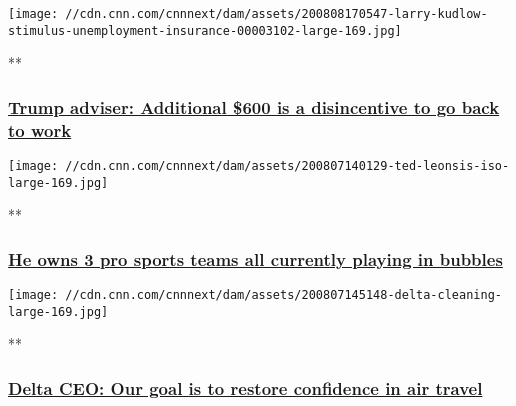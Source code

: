 \href{/videos/business/2020/08/07/larry-kudlow-stimulus-unemployment-insurance.cnnbusiness/video/playlists/business-news/}{}

\texttt{[image: //cdn.cnn.com/cnnnext/dam/assets/200808170547-larry-kudlow-stimulus-unemployment-insurance-00003102-large-169.jpg]}

**

\hypertarget{trump-adviser-additional-600-is-a-disincentive-to-go-back-to-work}{%
\subsubsection{\texorpdfstring{\href{/videos/business/2020/08/07/larry-kudlow-stimulus-unemployment-insurance.cnnbusiness/video/playlists/business-news/}{Trump
adviser: Additional \$600 is a disincentive to go back to
work}}{Trump adviser: Additional \$600 is a disincentive to go back to work}}\label{trump-adviser-additional-600-is-a-disincentive-to-go-back-to-work}}

\href{/videos/business/2020/08/07/ted-leonsis-washington-nationals-mystics-wizards-sports-bubble-interview.cnn/video/playlists/business-news/}{}

\texttt{[image: //cdn.cnn.com/cnnnext/dam/assets/200807140129-ted-leonsis-iso-large-169.jpg]}

**

\hypertarget{he-owns-3-pro-sports-teams-all-currently-playing-in-bubbles}{%
\subsubsection{\texorpdfstring{\href{/videos/business/2020/08/07/ted-leonsis-washington-nationals-mystics-wizards-sports-bubble-interview.cnn/video/playlists/business-news/}{He
owns 3 pro sports teams all currently playing in
bubbles}}{He owns 3 pro sports teams all currently playing in bubbles}}\label{he-owns-3-pro-sports-teams-all-currently-playing-in-bubbles}}

\href{/videos/business/2020/08/07/delta-ceo-ed-bastian-safety-flying-covid-19-coronavirus.cnnbusiness/video/playlists/business-news/}{}

\texttt{[image: //cdn.cnn.com/cnnnext/dam/assets/200807145148-delta-cleaning-large-169.jpg]}

**

\hypertarget{delta-ceo-our-goal-is-to-restore-confidence-in-air-travel}{%
\subsubsection{\texorpdfstring{\href{/videos/business/2020/08/07/delta-ceo-ed-bastian-safety-flying-covid-19-coronavirus.cnnbusiness/video/playlists/business-news/}{Delta
CEO: Our goal is to restore confidence in air
travel}}{Delta CEO: Our goal is to restore confidence in air travel}}\label{delta-ceo-our-goal-is-to-restore-confidence-in-air-travel}}

